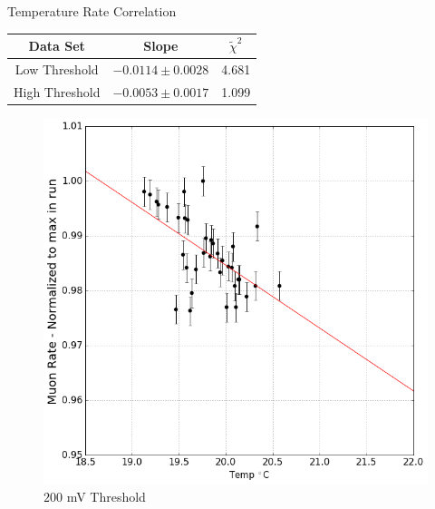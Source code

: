 \documentclass{beamer}
\begin{document}
\begin{frame}{Temperature Rate Correlation}
\centering

\small{
\begin{center}
	\begin{tabular}{|c|c|c|}\hline
		Data Set & Slope & $\tilde{\chi}^2$ \\ \hline\hline
		Low Threshold& $-0.0114 \pm 0.0028 $ & 4.681  \\ \hline
		High Threshold &$-0.0053 \pm 0.0017 $ & 1.099\\ \hline
	\end{tabular}
\end{center}
}

\begin{figure}
\begin{multicols}{2}
\centering
\includegraphics[scale=.22]{../Figures/lowCorrelation.png}\\
$200$ mV Threshold

\end{multicols}
\end{figure}
\end{frame}
\end{document}
